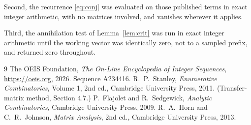 \documentclass[11pt,a4paper]{article}
\theoremstyle{plain}
\theoremstyle{definition}
\begin{document}
Second, the recurrence \eqref{eq:conj} was evaluated on those published terms in exact
integer arithmetic, with no matrices involved, and vanishes wherever it applies.

Third, the annihilation test of Lemma~\ref{lem:crit} was run in exact integer arithmetic
until the working vector was identically zero, not to a sampled prefix, and returned zero
throughout.

\begin{thebibliography}{9}
 The OEIS Foundation, \emph{The On-Line Encyclopedia of Integer
Sequences}, \url{https://oeis.org}, 2026. Sequence A234416.
 R.~P.~Stanley, \emph{Enumerative Combinatorics}, Volume 1, 2nd ed.,
Cambridge University Press, 2011. (Transfer-matrix method, Section 4.7.)
 P.~Flajolet and R.~Sedgewick, \emph{Analytic Combinatorics}, Cambridge
University Press, 2009.
 R.~A.~Horn and C.~R.~Johnson, \emph{Matrix Analysis}, 2nd ed., Cambridge
University Press, 2013.
\end{thebibliography}
\end{document}
